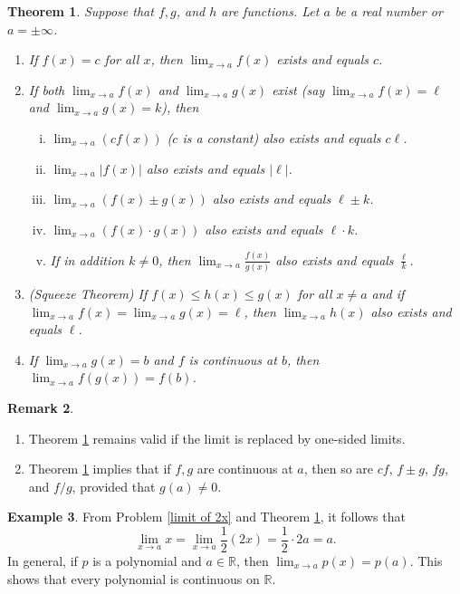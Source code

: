 \documentclass[12pt,letterpaper]{book}
\numberwithin{equation}{section}
\newtheorem{thm}{\textbf{Theorem}}[section]
\theoremstyle{definition}
\newtheorem{example}[thm]{\textbf{Example}}
\newtheorem{remark}[thm]{\textbf{Remark}}
\begin{document}
\begin{thm}\label{properties of limits} Suppose that $f,g$, and $h$ are functions. Let $a$ be a real number or $a=\pm\infty$.
\begin{enumerate}
\item If $f(x)=c$ for all $x$, then $\displaystyle{\lim_{x\to a}}f(x)$ exists and equals $c$.
\item If both $\displaystyle{\lim_{x\to a}}f(x)$ and $\displaystyle{\lim_{x\to a}}g(x)$ exist (say $\displaystyle{\lim_{x\to a}}f(x)=\ell$ and $\displaystyle{\lim_{x\to a}}g(x)=k$), then
    \begin{enumerate}[i.]
    \item $\displaystyle{\lim_{x\to a}}(cf(x))$ ($c$ is a constant) also exists and equals $c\ell$.
    \item $\displaystyle{\lim_{x\to a}}|f(x)|$ also exists and equals $|\ell|$.
    \item $\displaystyle{\lim_{x\to a}}(f(x)\pm g(x))$ also exists and equals $\ell\pm k$.
    \item $\displaystyle{\lim_{x\to a}}(f(x)\cdot g(x))$ also exists and equals $\ell\cdot k$.
    \item If in addition $k\neq 0$, then $\displaystyle{\lim_{x\to a}}\frac{f(x)}{g(x)}$ also exists and equals $\frac{\ell}{k}$.
    \end{enumerate}
\item (Squeeze Theorem) If $f(x)\leq h(x)\leq g(x)$ for all $x\neq a$ and if $\displaystyle{\lim_{x\to a}f(x)=\lim_{x\to a}g(x)=\ell}$, then $\displaystyle{\lim_{x\to a}}h(x)$ also exists and equals $\ell$.
\item If $\displaystyle{\lim_{x\to a}g(x)=b}$ and $f$ is continuous at $b$, then $\displaystyle{\lim_{x\to a}f(g(x))=f(b)}$.
\end{enumerate}
\end{thm}

\begin{remark}\quad
\begin{enumerate}
\item Theorem \ref{properties of limits} remains valid if the limit is replaced by one-sided limits.
\item Theorem \ref{properties of limits} implies that if $f,g$ are continuous at $a$, then so are $cf$, $f \pm g$, $fg$, and $f/g$, provided that $g(a)\neq 0$.
\end{enumerate}
\end{remark}

\begin{example}\label{poly conti}
From Problem \ref{limit of 2x} and Theorem \ref{properties of limits}, it follows that
$$\lim_{x\to a} x = \lim_{x\to a} \frac{1}{2}(2x)=\frac{1}{2}\cdot 2a=a.$$ In general, if $p$ is a polynomial and $a\in \mathbb{R}$, then $\displaystyle{\lim_{x\to a}p(x)=p(a)}$. This shows that every polynomial is continuous on $\mathbb{R}$.
\end{example}
\end{document}

